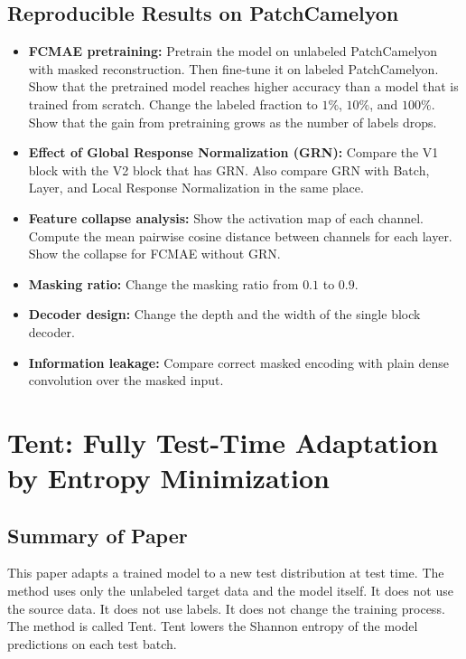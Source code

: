 \documentclass[11pt]{article}
\begin{document}
\subsection*{Reproducible Results on PatchCamelyon}
\begin{itemize}
  \item \textbf{FCMAE pretraining:} Pretrain the model on unlabeled
        PatchCamelyon with masked reconstruction. Then fine-tune it on labeled
        PatchCamelyon. Show that the pretrained model reaches higher accuracy
        than a model that is trained from scratch. Change the labeled fraction to
        $1\%$, $10\%$, and $100\%$. Show that the gain from pretraining grows as
        the number of labels drops.
  \item \textbf{Effect of Global Response Normalization (GRN):} Compare the V1 block with the V2 block that has
        GRN. Also compare GRN with Batch, Layer, and Local Response Normalization
        in the same place.
  \item \textbf{Feature collapse analysis:} Show the activation map of each
        channel. Compute the mean pairwise cosine distance between channels for
        each layer. Show the collapse for FCMAE without GRN.
  \item \textbf{Masking ratio:} Change the masking ratio from $0.1$ to $0.9$.
  \item \textbf{Decoder design:} Change the depth and the width of the single
        block decoder.
  \item \textbf{Information leakage:} Compare correct masked encoding with plain
        dense convolution over the masked input.
\end{itemize}


\section{Tent: Fully Test-Time Adaptation by Entropy Minimization}
\label{sec:tent}

\subsection*{Summary of Paper}
This paper adapts a trained model to a new test distribution at test time. The
method uses only the unlabeled target data and the model itself. It does not use
the source data. It does not use labels. It does not change the training process.
The method is called Tent. Tent lowers the Shannon entropy of the model
predictions on each test batch.
\end{document}
